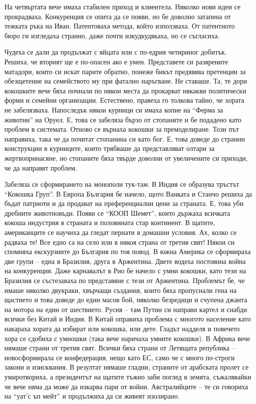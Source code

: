 \documentclass[ebook,openany,12pt]{memoir}
\begin{document}
На четвъртата вече имаха стабилен приход и клиентела. Няколко нови идеи се прокрадваха. Конкуренция се опита да се появи, но бе доволно затапена от тежката ръка на Иван. Патентоваха метода, който използваха. От патентното бюро ги изгледаха странно, даже почти изкудкудякаха, но се съгласиха. 

Чудеха се дали да продължат с яйцата или с по-едрия четириног добитък. Решиха, че вторият ще е по-опасен ако е умен. Представете си разярените матадори, които си искат парите обратно, понеже бикът предявява претенции за обезщетение на семейството му при фатално наръгване. Не ставаше. Та, те дори кокошките вече бяха почнали по някои места да прокарват някакви политически форми и семейни организации. Естествено, правеха го толкова тайно, че хората не забелязваха. Напоследък някои курници си имаха копие на ``Ферма за животни'' на Оруел. Е, това се забеляза бързо от стопаните и бе подадено като проблем в системата. Отново се върнаха кокошки за премоделиране. Този път направиха, така че да почитат стопанина си като бог. Е, това доведе до странни конструкции в курниците, които трябваше да представляват олтари за жертвопринасяне, но стопаните бяха твърде доволни от увеличените си приходи, че да направят проблем.

Забеляза се сформирането на монополи тук-там. В Индия се образува тръстът ``Кокошка Груп''. В Европа България бе начело, щото Ванката и Станчо решиха да бъдат патриоти и да продават на преференциални цени за страната. Е, това уби дребните животновъди. Появи се ``КООП Шемет'', които държаха всичката кокоша индустрия в страната и половината стар континент. В щатите, американците се научиха да гледат пернати в домашни условия. Ах, колко се радваха те! Все едно са на село или в някоя страна от третия свят! Някои си спомняха екскурзиите до България по тоя повод. В южна Америка се сформираха две групи – една в Бразилия, друга в Аржентина. Двете водеха постоянна война на конкуренция. Даже карнавалът в Рио бе начело с умни кокошки, като тези на Бразилия се състезаваха по представяне с тези от Аржентина. Проблемът бе, че имаше няколко двукраки, хвърчащи създания, които бяха пропуснали гена на щастието и това доведе до един масов бой, няколко безредици и счупена джанта на мотора на един от шествието. Русия – там Путин си направи картел и снабди всички без Китай и Индия. В Китай оправиха проблема с многото население като накараха хората да избират или кокошка, или дете. Гладът надделя и повечето хора се сдобиха с умношки (така вече наричаха умните кокошки). В Африка вече нямаше страни от третия свят. Всички бяха страни от Летящата република – новосформирала се конфедерация, нещо като ЕС, само че с много по-строги закони и изисквания. В резултат нямаше гладни, страните от арабската пролет се умиротвориха, а президентът на щатите тъжно заби поглед в земята, съжалявайки че вече няма да може да изкарва пари от войни. Австралийците – те си говориха на ``уат’с ъп мейт'' и продължиха да си живеят изолирано.
\end{document}
